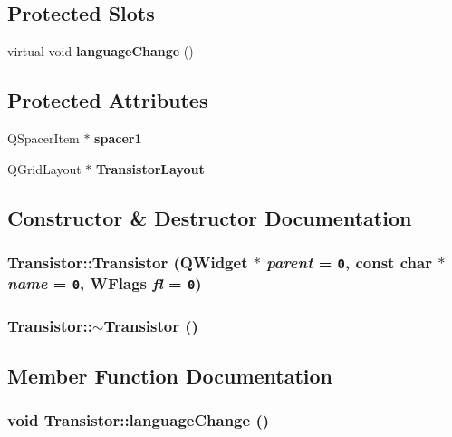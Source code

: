 \subsection*{Protected Slots}
\begin{CompactItemize}
\item 
virtual void {\bf language\-Change} ()
\end{CompactItemize}
\subsection*{Protected Attributes}
\begin{CompactItemize}
\item 
QSpacer\-Item $\ast$ {\bf spacer1}
\item 
QGrid\-Layout $\ast$ {\bf Transistor\-Layout}
\end{CompactItemize}


\subsection{Constructor \& Destructor Documentation}
\subsubsection{\setlength{\rightskip}{0pt plus 5cm}Transistor::Transistor (QWidget $\ast$ {\em parent} = {\tt 0}, const char $\ast$ {\em name} = {\tt 0}, WFlags {\em fl} = {\tt 0})}\label{classTransistor_8c7560027f7ea2f8c4d9541a29738096}


\subsubsection{\setlength{\rightskip}{0pt plus 5cm}Transistor::$\sim$Transistor ()}\label{classTransistor_45c568818827755518ac3b7e3e659fc0}




\subsection{Member Function Documentation}
\subsubsection{\setlength{\rightskip}{0pt plus 5cm}void Transistor::language\-Change ()\hspace{0.3cm}{\tt  [protected, virtual, slot]}}\label{classTransistor_1182bf5637039731d24c9b1e622b4179}


